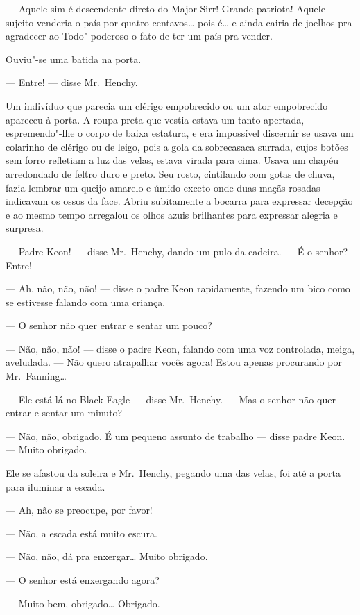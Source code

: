--- Aquele sim é descendente direto do Major Sirr!  Grande patriota!  Aquele
sujeito venderia o país por quatro centavos\textit{\ldots{}} pois é\ldots{} e
ainda cairia de joelhos pra agradecer ao Todo"-poderoso o fato de ter um país
pra vender.

Ouviu"-se uma batida na porta.

--- Entre! --- disse Mr.~Henchy.

Um indivíduo que parecia um clérigo empobrecido ou um ator empobrecido apareceu
à porta.  A roupa preta que vestia estava um tanto apertada, espremendo"-lhe o
corpo de baixa estatura, e era impossível discernir se usava um colarinho de
clérigo ou de leigo, pois a gola da sobrecasaca surrada, cujos botões sem forro
refletiam a luz das velas, estava virada para cima.  Usava um chapéu
arredondado de feltro duro e preto.  Seu rosto, cintilando com gotas de chuva,
fazia lembrar um queijo amarelo e úmido exceto onde duas maçãs rosadas
indicavam os ossos da face.  Abriu subitamente a bocarra para expressar
decepção e ao mesmo tempo arregalou os olhos azuis brilhantes para expressar
alegria e surpresa.

--- Padre Keon! --- disse Mr.~Henchy, dando um pulo da cadeira.  --- É o
senhor? Entre!

--- Ah, não, não, não! --- disse o padre Keon rapidamente, fazendo um bico como
se estivesse falando com uma criança.

--- O senhor não quer entrar e sentar um pouco?

--- Não, não, não! --- disse o padre Keon, falando com uma voz controlada,
meiga, aveludada.  --- Não quero atrapalhar vocês agora!  Estou apenas
procurando por Mr.~Fanning\ldots{}

--- Ele está lá no Black Eagle --- disse Mr.~Henchy.  --- Mas o senhor não quer
entrar e sentar um minuto?

--- Não, não, obrigado.  É um pequeno assunto de trabalho --- disse padre Keon.
--- Muito obrigado.

Ele se afastou da soleira e Mr.~Henchy, pegando uma das velas, foi até a porta
para iluminar a escada.

--- Ah, não se preocupe, por favor!

--- Não, a escada está muito escura.

--- Não, não, dá pra enxergar\ldots{} Muito obrigado.

--- O senhor está enxergando agora?

--- Muito bem, obrigado\ldots{} Obrigado.

